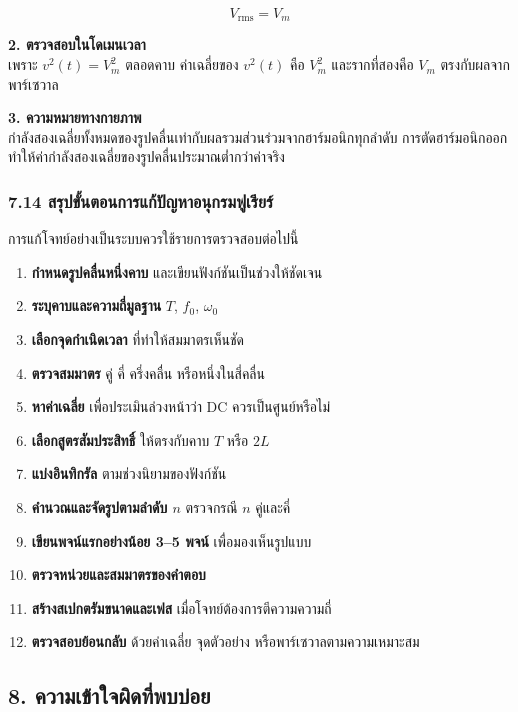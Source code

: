 \[
V_{\mathrm{rms}}=V_m
\]

\textbf{2. ตรวจสอบในโดเมนเวลา}\\
เพราะ \(v^2(t)=V_m^2\) ตลอดคาบ ค่าเฉลี่ยของ \(v^2(t)\) คือ \(V_m^2\) และรากที่สองคือ \(V_m\) ตรงกับผลจากพาร์เซวาล

\textbf{3. ความหมายทางกายภาพ}\\
กำลังสองเฉลี่ยทั้งหมดของรูปคลื่นเท่ากับผลรวมส่วนร่วมจากฮาร์มอนิกทุกลำดับ การตัดฮาร์มอนิกออกทำให้ค่ากำลังสองเฉลี่ยของรูปคลื่นประมาณต่ำกว่าค่าจริง

\subsubsection{7.14 สรุปขั้นตอนการแก้ปัญหาอนุกรมฟูเรียร์}

การแก้โจทย์อย่างเป็นระบบควรใช้รายการตรวจสอบต่อไปนี้

\begin{enumerate}
\def\labelenumi{\arabic{enumi}.}
\item
  \textbf{กำหนดรูปคลื่นหนึ่งคาบ} และเขียนฟังก์ชันเป็นช่วงให้ชัดเจน
\item
  \textbf{ระบุคาบและความถี่มูลฐาน} \(T\), \(f_0\), \(\omega_0\)
\item
  \textbf{เลือกจุดกำเนิดเวลา} ที่ทำให้สมมาตรเห็นชัด
\item
  \textbf{ตรวจสมมาตร} คู่ คี่ ครึ่งคลื่น หรือหนึ่งในสี่คลื่น
\item
  \textbf{หาค่าเฉลี่ย} เพื่อประเมินล่วงหน้าว่า DC ควรเป็นศูนย์หรือไม่
\item
  \textbf{เลือกสูตรสัมประสิทธิ์} ให้ตรงกับคาบ \(T\) หรือ \(2L\)
\item
  \textbf{แบ่งอินทิกรัล} ตามช่วงนิยามของฟังก์ชัน
\item
  \textbf{คำนวณและจัดรูปตามลำดับ \(n\)} ตรวจกรณี \(n\) คู่และคี่
\item
  \textbf{เขียนพจน์แรกอย่างน้อย 3--5 พจน์} เพื่อมองเห็นรูปแบบ
\item
  \textbf{ตรวจหน่วยและสมมาตรของคำตอบ}
\item
  \textbf{สร้างสเปกตรัมขนาดและเฟส} เมื่อโจทย์ต้องการตีความความถี่
\item
  \textbf{ตรวจสอบย้อนกลับ} ด้วยค่าเฉลี่ย จุดตัวอย่าง หรือพาร์เซวาลตามความเหมาะสม
\end{enumerate}


\subsection{8. ความเข้าใจผิดที่พบบ่อย}


